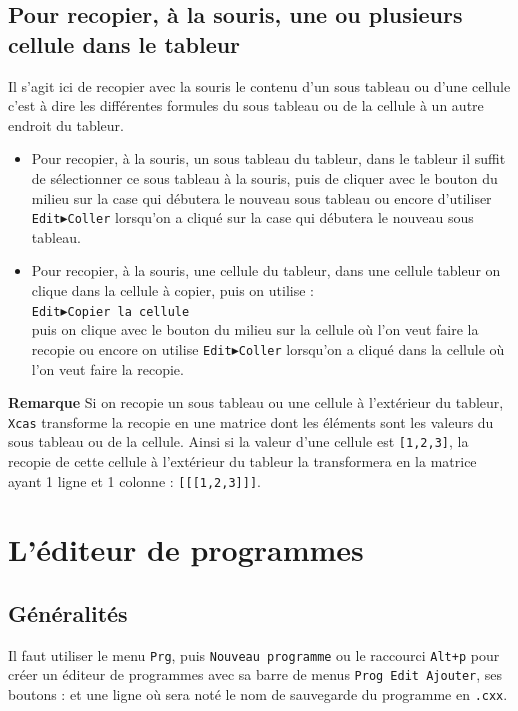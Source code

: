 \documentclass[a4paper,11pt]{article}
\begin{document}
\subsection{Pour recopier, \`a la souris, une ou plusieurs cellule dans le 
tableur}
Il s'agit ici de recopier avec la souris le contenu d'un sous tableau ou d'une 
cellule c'est \`a dire les diff\'erentes formules du sous tableau ou de la 
cellule \`a un autre endroit du tableur.
\begin{itemize}
\item Pour recopier, \`a la souris, un sous tableau du tableur, dans le 
tableur il suffit de s\'electionner ce sous tableau \`a la souris, puis de 
cliquer avec le bouton du milieu sur la case qui d\'ebutera le nouveau 
sous tableau ou encore d'utiliser {\tt Edit$\blacktriangleright$Coller} 
lorsqu'on a cliqu\'e sur la case qui d\'ebutera le nouveau sous tableau.
\item Pour recopier, \`a la souris, une cellule du tableur, dans une cellule 
tableur on clique dans la cellule \`a copier, puis on utilise : \\
{\tt Edit$\blacktriangleright$Copier la cellule}\\
puis on clique avec le bouton du milieu sur la cellule o\`u l'on veut faire la 
recopie ou encore on utilise {\tt Edit$\blacktriangleright$Coller} 
lorsqu'on a cliqu\'e dans la cellule o\`u l'on veut faire la recopie.
\end{itemize}
{\bf Remarque}
Si on  recopie un sous tableau  ou une cellule \`a l'ext\'erieur du tableur, 
{\tt Xcas} transforme la recopie en une matrice dont les \'el\'ements sont 
les valeurs du sous tableau ou de la cellule. Ainsi si la valeur d'une cellule
est {\tt [1,2,3]}, la recopie de cette cellule \`a l'ext\'erieur du tableur
la transformera en la matrice ayant 1 ligne et 1 colonne : {\tt [[[1,2,3]]]}.

\section{L'\'editeur de programmes}
\subsection{G\'en\'eralit\'es}
Il faut utiliser le menu {\tt Prg}, puis {\tt Nouveau programme} ou le 
raccourci {\tt Alt+p} pour cr\'eer un \'editeur de programmes avec sa barre de 
menus {\tt Prog Edit Ajouter}, ses boutons : 
   et une ligne o\`u 
sera not\'e le nom de sauvegarde du programme en {\tt .cxx}.
\end{document}
